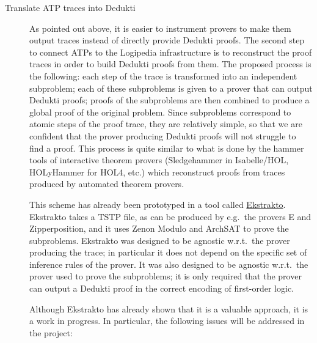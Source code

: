 \begin{description}
\item[Translate ATP traces into Dedukti] As pointed out above, it is easier to
  instrument provers to make them output traces instead of directly provide
  Dedukti proofs. The second step to connect ATPs to the Logipedia
  infrastructure is to reconstruct the proof traces in order to build Dedukti
  proofs from them. The proposed process is the following: each step of the
  trace is transformed into an independent subproblem; each of these subproblems
  is given to a prover that can output Dedukti proofs; proofs of the subproblems
  are then combined to produce a global proof of the original problem.  Since
  subproblems correspond to atomic steps of the proof trace, they are relatively
  simple, so that we are confident that the prover producing Dedukti proofs will
  not struggle to find a proof. This process is quite similar to what is done by
  the hammer tools of interactive theorem provers (Sledgehammer in Isabelle/HOL,
  HOLyHammer for HOL4, etc.) which reconstruct proofs from traces produced by
  automated theorem provers.

  This scheme has already been prototyped in a tool called
  \href{https://github.com/Deducteam/ekstrakto}{Ekstrakto}. Ekstrakto takes a
  TSTP file, as can be produced by e.g.\ the provers E and Zipperposition, and
  it uses Zenon Modulo and ArchSAT to prove the subproblems. Ekstrakto was
  designed to be agnostic w.r.t.\ the prover producing the trace; in particular
  it does not depend on the specific set of inference rules of the prover. It
  was also designed to be agnostic w.r.t.\ the prover used to prove the
  subproblems; it is only required that the prover can output a Dedukti proof in
  the correct encoding of first-order logic.

  Although Ekstrakto has already shown that it is a valuable approach, it is a
  work in progress. In particular, the following issues will be addressed in the
  project:

\end{description}
